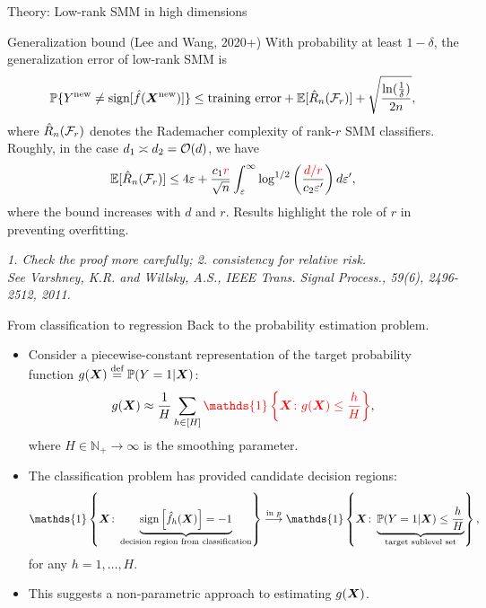 \documentclass[compress,dvipsnames]{beamer}
\let\olditem\item
\renewcommand\item{\olditem\justifying}
\begin{document}
\begin{frame}{Theory: Low-rank SMM in high dimensions}

\begin{block}{Generalization bound (Lee and Wang, 2020+)}
With probability at least $1-\delta$, the generalization error of low-rank SMM is
\[
\mathbb{P}\{Y^{\text{new}}\neq \text{sign}[\hat f(\bm{X}^{\text{new}})]\} \leq \text{training error} +\mathbb{E}[\hat R_n({\mathcal F}_r)]+\sqrt{\ln({1\over \delta})\over 2n},
\]
where $\hat R_{n}({\mathcal F}_r)$ denotes the Rademacher complexity of rank-$r$ SMM classifiers. Roughly, in the case $d_1\asymp d_2={\mathcal O}(d)$, we have
\[
\mathbb{E}[\hat R_{n}({\mathcal F}_r)] \leq 4\varepsilon+{c_1{\color{red}r} \over \sqrt{n}} \int_{\varepsilon}^{\infty}\log^{1/2} \left({{\color{red} d/r}\over c_2\varepsilon'} \right)d\varepsilon',
\]
where the bound increases with {\color{red}$d$ and $r$}. Results highlight the role of $r$ in preventing overfitting. 
\end{block}



{\scriptsize \it 1. Check the proof more carefully; 2. consistency for relative risk. \\

See Varshney, K.R. and Willsky, A.S., IEEE Trans. Signal Process., 59(6), 2496-2512, 2011.}

\end{frame}


\begin{frame}{From classification to regression}
Back to the probability estimation problem. 
\begin{itemize}
\item Consider a piecewise-constant representation of the target probability function $g(\bm{X})\stackrel{\text{def}}{=}\mathbb{P}(Y=1|\bm{X})$:
\[
g(\mX) \approx {1\over H}\sum_{h\in[H]}{\color{red} \mathds{1}\left\{\mX\colon g(\mX)\leq {h\over H}\right\} },
\]
where $H\in\mathbb{N}_{+} \to \infty$ is the smoothing parameter. 
\item The classification problem has provided candidate decision regions:
\[
 \mathds{1}\left\{\mX\colon \KeepStyleUnderBrace{\text{sign}\left[\hat{f}_{h}(\mX)\right]=-1}_{\text{decision region from classification}}\right\} \stackrel{\text{in $p$}}{\longrightarrow} \mathds{1}\left\{ \mX\colon \KeepStyleUnderBrace{\mathbb{P}(Y=1|\mX)\leq {h\over H}}_{\text{target sublevel set}} \right\},
\]
for any $h=1,\ldots,H$.
\item This suggests a non-parametric approach to estimating $g(\bm{X})$.
\end{itemize}
\end{frame}
\end{document}

